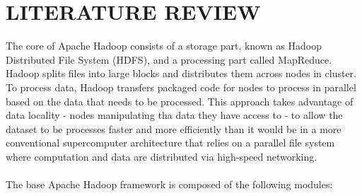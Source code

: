 \documentclass[a4paper,12pt,oneside]{report}
\begin{document}
\section{LITERATURE REVIEW}
The core of Apache Hadoop consists of a storage part, known as Hadoop Distributed File System (HDFS), and a processing part called MapReduce. Hadoop splits files into large blocks and distributes them across nodes in cluster. To process data, Hadoop transfers packaged code for nodes to process in parallel
based on the data that needs to be processed. This approach takes advantage of data locality - nodes manipulating tha data they have access to - to allow the dataset to be processes faster and more efficiently than it would be in a more conventional supercomputer architecture that relies on a parallel file 
system where computation and data are distributed via high-speed networking.\\
\\
The base Apache Hadoop framework is composed of the following modules:
\end{document}
